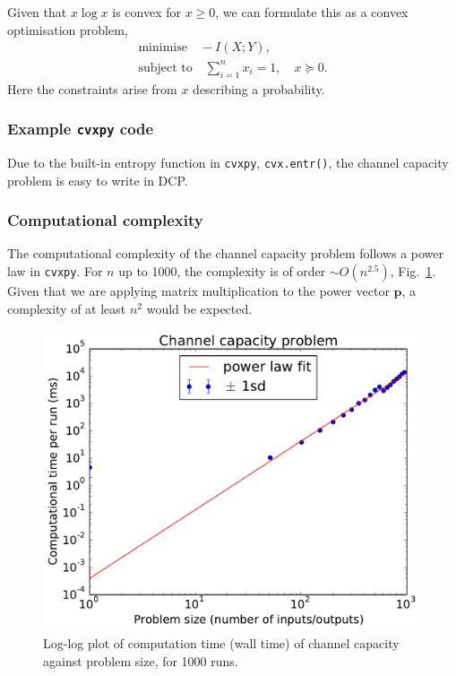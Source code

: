 \documentclass[twocolumn,secnumarabic,amssymb, nobibnotes, aps, prl,superscriptaddress]{revtex4-1}
\begin{document}
Given that $x\log x$ is convex for $x\geq 0$, we can formulate this as a convex optimisation problem,
\begin{align}
\text{minimise} \quad -I(X;Y), \\
\text{subject to} \quad \sum_{i=1}^{n}x_i = 1, \quad x \succeq 0.
\end{align} Here the constraints arise from $x$ describing a probability.

\subsubsection{Example \texttt{cvxpy} code}
Due to the built-in entropy function in \texttt{cvxpy}, \texttt{cvx.entr()}, the channel capacity problem is easy to write in DCP.



\subsubsection{Computational complexity}
The computational complexity of the channel capacity problem follows a power law in \texttt{cvxpy}.  For $n$ up to 1000, the complexity is of order $\sim O(n^{2.5})$, Fig.~\ref{fig:channel_capacity_complexity}. Given that we are applying matrix multiplication to the power vector $\textbf{p}$, a complexity of at least $n^2$ would be expected.
\begin{figure}
\includegraphics[width=0.9\linewidth]{channel_capacity_complexity.pdf}
\caption{\label{fig:channel_capacity_complexity}Log-log plot of computation time (wall time) of channel capacity against problem size, for 1000 runs.}
\end{figure}
\end{document}
